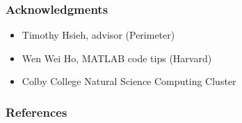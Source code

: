 \documentclass{beamer}
\theoremstyle{definition}
\begin{document}

\begin{frame}
\frametitle{Acknowledgments}


\begin{itemize}
	\item Timothy Hsieh, advisor (Perimeter)
	
	\item Wen Wei Ho, MATLAB code tips (Harvard)
	
	\item Colby College Natural Science Computing Cluster
	
\end{itemize}

\end{frame}



\begin{frame}[allowframebreaks]
\frametitle{References}




{}



\end{frame}
\end{document}
